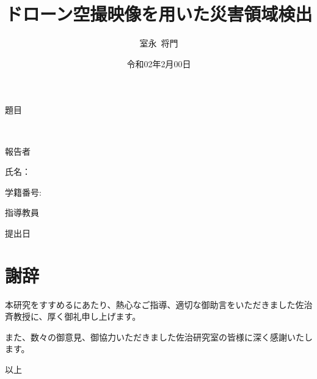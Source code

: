 \documentclass[xelatex, a4paper, 10pt, titlepage, ja=standard, Ligatures=TeX, precisetext]{bxjsreport}
\title{ドローン空撮映像を用いた災害領域検出}
\author{室永\ 将門}
\date{令和02年2月00日}
\makeatletter
\renewcommand{\maketitle}{
      \vspace*{20mm}
      \begin{center}
        {\huge \@thesis \par}
        \vspace{10mm}
        {\huge 題目 \par}
        {\huge\ \@title \par}
        \vspace{10mm}
        {\LARGE 報告者 \par}
        {\LARGE 氏名：\ \@author \par}
        {\LARGE 学籍番号:\ \@id \par}
        \vspace{10mm}
        {\LARGE 指導教員 \par}
        {\LARGE \@teacher \par}
        \vspace{20mm}
        {\Large 提出日 \par}
        {\Large \@date \par}
        {\Large \@department \par}
      \end{center}
    }
\makeatother
\begin{document}
  \begin{titlepage}
    \maketitle
  \end{titlepage}


  \tableofcontents

  
  
  
  

  
  

  \chapter*{謝辞} %
    \label{cha:謝辞}

    本研究をすすめるにあたり、熱心なご指導、適切な御助言をいただきました佐治斉教授に、厚く御礼申し上げます。

    また、数々の御意見、御協力いただきました佐治研究室の皆様に深く感謝いたします。

    \vspace*{3ex}
    \begin{flushright}
      以上
    \end{flushright}
\end{document}
